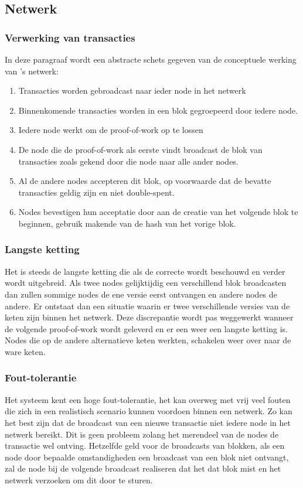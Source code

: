 	\subsection{Netwerk}
		\subsubsection{Verwerking  van transacties}
		In deze paragraaf wordt een abstracte schets gegeven van de conceptuele werking van \textcite{Nakamoto2008}’s netwerk:
		\begin{enumerate}
			\item Transacties worden gebroadcast naar ieder node in het netwerk
			\item Binnenkomende transacties worden in een blok gegroepeerd door iedere node.
			\item Iedere node werkt om de proof-of-work op te lossen
			\item De node die de proof-of-work als eerste vindt broadcast de blok van transacties zoals gekend door die node naar alle ander nodes.
			\item Al de andere nodes accepteren dit blok, op voorwaarde dat de bevatte transacties geldig zijn en niet double-spent.
			\item Nodes bevestigen hun acceptatie door aan de creatie van het volgende blok te beginnen, gebruik makende van de hash van het vorige blok.
		\end{enumerate}
		\subsubsection{Langste ketting}
		Het is steeds de langste ketting die als de correcte wordt beschouwd en verder wordt uitgebreid. Als twee nodes gelijktijdig een verschillend blok broadcasten dan zullen sommige nodes de ene versie eerst ontvangen en andere nodes de andere. Er ontstaat dan een situatie waarin er twee verschillende versies van de keten zijn binnen het netwerk. Deze discrepantie wordt pas weggewerkt wanneer de volgende proof-of-work wordt geleverd en er een weer een langste ketting is. Nodes die op de andere alternatieve keten werkten, schakelen weer over naar de ware keten.
		\subsubsection{Fout-tolerantie}
		Het systeem kent een hoge fout-tolerantie, het kan overweg met vrij veel fouten die zich in een realistisch scenario  kunnen voordoen binnen een netwerk. Zo kan het best zijn dat de broadcast van een nieuwe transactie niet iedere node in het netwerk bereikt. Dit is geen probleem zolang het merendeel van de nodes de transactie wel ontving. Hetzelfde geld voor de broadcasts van blokken, als een node door bepaalde omstandigheden een broadcast van een blok niet ontvangt, zal de node bij de volgende broadcast realiseren dat het dat blok mist en het netwerk verzoeken om dit door te sturen.
